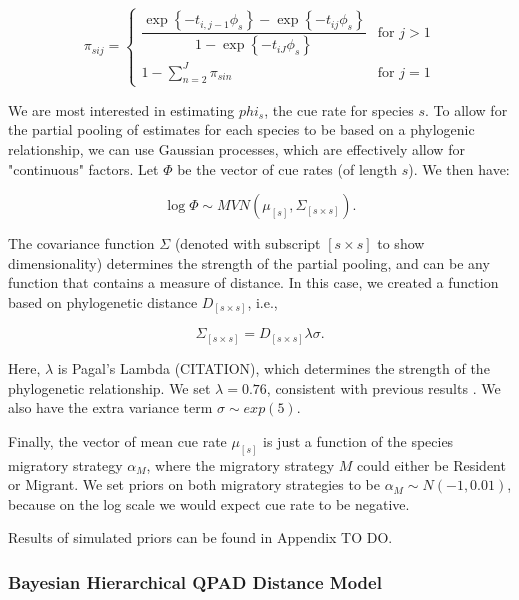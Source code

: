 \documentclass[12pt]{article}
\begin{document}
\begin{equation*}
	\pi_{sij} = 
	\begin{cases}
		\dfrac{\exp\left\{ -t_{i,j-1}\phi_{s} \right\} - \exp\left\{ -t_{ij}\phi_{s} \right\}}{1 - \exp\left\{ -t_{iJ}\phi_{s} \right\}} & \text{for } j > 1 \\
		1 - \sum_{n = 2}^{J} \pi_{sin} & \text{for } j = 1
	\end{cases}
\end{equation*}

\par We are most interested in estimating $phi_s$, the cue rate for species $s$. 
To allow for the partial pooling of estimates for each species to be based on a phylogenic relationship, we can use Gaussian processes, which are effectively allow for "continuous" factors. 
Let $\Phi$ be the vector of cue rates (of length $s$). 
We then have:

$$\log \Phi \sim MVN\left( \mu_{[s]}, \Sigma_{[s \times s]} \right).$$

\par The covariance function $\Sigma$ (denoted with subscript $[s \times s]$ to show dimensionality) determines the strength of the partial pooling, and can be any function that contains a measure of distance. 
In this case, we created a function based on phylogenetic distance $D_{[s \times s]}$, i.e.,

$$\Sigma_{[s \times s]} = D_{[s \times s]}\lambda\sigma.$$

\par Here, $\lambda$ is Pagal's Lambda (CITATION), which determines the strength of the phylogenetic relationship. 
We set $\lambda = 0.76$, consistent with previous results \cite{solymos_phylogeny_2018}. 
We also have the extra variance term $\sigma \sim exp(5)$.

\par Finally, the vector of mean cue rate $\mu_{[s]}$ is just a function of the species migratory strategy $\alpha_M$, where the migratory strategy $M$ could either be Resident or Migrant. 
We set priors on both migratory strategies to be $\alpha_M \sim N(-1, 0.01)$, because on the log scale we would expect cue rate to be negative. 

\par Results of simulated priors can be found in Appendix TO DO.

\subsubsection{Bayesian Hierarchical QPAD Distance Model}
\end{document}
